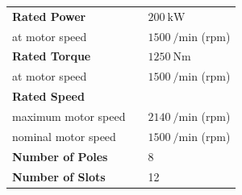 \setlength\arrayrulewidth{1pt}
\begin{center}
	\setlength{\extrarowheight}{6pt}
	\begin{tabular}{m{16em} m{8em} m{8em}}
		\textbf{Rated Power} & \hspace{20mm} & $\SI{200}{\kilo\watt}$ \\[6pt]
		\hspace{5mm}at motor speed & \hspace{20mm} & $\SI{1500}{\per\minute}$ (rpm) \\[6pt]
		\textbf{Rated Torque} & \hspace{20mm} & $\SI{1250}{\newton\meter}$ \\[6pt]
		\hspace{5mm}at motor speed & \hspace{20mm} & $\SI{1500}{\per\minute}$ (rpm) \\[6pt]
		\textbf{Rated Speed} & \hspace{20mm} & \\[6pt]
		\hspace{5mm}maximum motor speed & \hspace{20mm} & $\SI{2140}{\per\minute}$ (rpm) \\[6pt]
		\hspace{5mm}nominal motor speed & \hspace{20mm} & $\SI{1500}{\per\minute}$ (rpm) \\[6pt]
		\textbf{Number of Poles} & \hspace{20mm} & 8\\[6pt]
		\textbf{Number of Slots} & \hspace{20mm} & 12\\[6pt]
	\end{tabular}
	\captionsetup{width=0.5\textwidth}		
	\label{motor_data}
\end{center}

